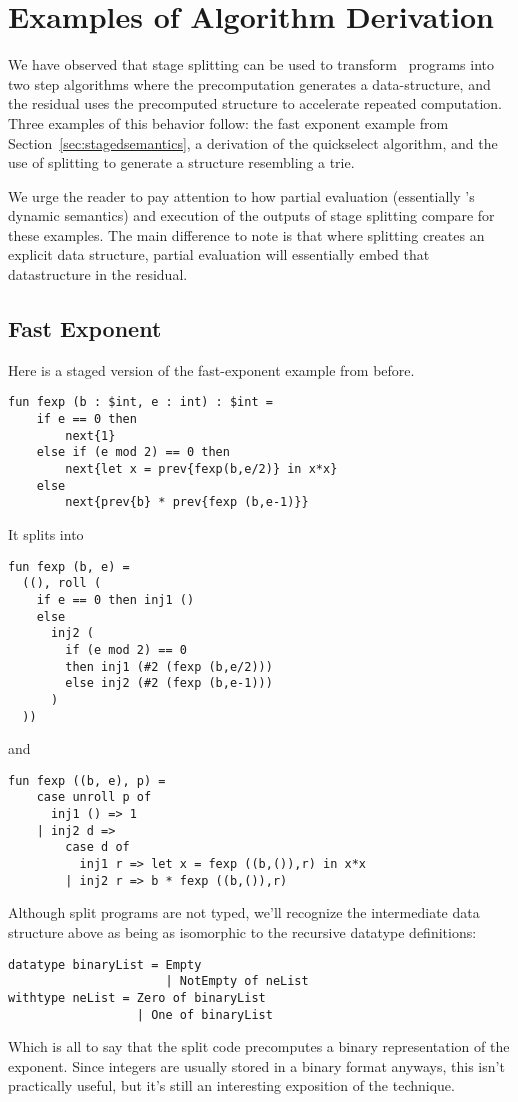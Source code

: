 

\section{Examples of Algorithm Derivation}
\label{sec:examples}

We have observed that stage splitting can be used to transform \lang\ programs into two step algorithms where the precomputation generates a data-structure, and the residual uses the precomputed structure to accelerate repeated computation.  Three examples of this behavior follow: the fast exponent example from Section~\ref{sec:stagedsemantics}, a derivation of the quickselect algorithm, and the use of splitting to generate a structure resembling a trie.
 
We urge the reader to pay attention to how partial evaluation (essentially \lang's dynamic semantics) and execution of the outputs of stage splitting compare for these examples.
The main difference to note is that where splitting creates an explicit data structure, partial evaluation will
essentially embed that datastructure in the residual. 

\subsection{Fast Exponent}

Here is a staged version of the fast-exponent example from before.
\begin{lstlisting} 
fun fexp (b : $int, e : int) : $int =
	if e == 0 then
		next{1}
	else if (e mod 2) == 0 then
		next{let x = prev{fexp(b,e/2)} in x*x}
	else
		next{prev{b} * prev{fexp (b,e-1)}}		
\end{lstlisting}
It splits into
\begin{lstlisting} 
fun fexp (b, e) =
  ((), roll (
    if e == 0 then inj1 ()
    else
      inj2 (
        if (e mod 2) == 0
        then inj1 (#2 (fexp (b,e/2)))
        else inj2 (#2 (fexp (b,e-1)))
      )
  ))
\end{lstlisting}
and
\begin{lstlisting} 
fun fexp ((b, e), p) =
	case unroll p of
	  inj1 () => 1
	| inj2 d =>
		case d of
		  inj1 r => let x = fexp ((b,()),r) in x*x
		| inj2 r => b * fexp ((b,()),r)
\end{lstlisting}

Although split programs are not typed, we'll recognize the intermediate data structure 
above as being as isomorphic to the recursive datatype definitions:
\begin{lstlisting} 
datatype binaryList = Empty 
                      | NotEmpty of neList
withtype neList = Zero of binaryList 
                  | One of binaryList
\end{lstlisting}
Which is all to say that the split code precomputes a binary representation of the exponent.
Since integers are usually stored in a binary format anyways, this isn't practically useful,
but it's still an interesting exposition of the technique.

